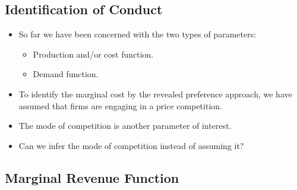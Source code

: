 \documentclass[
]{book}
\providecommand{\tightlist}{%
  \setlength{\itemsep}{0pt}\setlength{\parskip}{0pt}}
\begin{document}
\hypertarget{identification-of-conduct-1}{%
\subsection{Identification of Conduct}\label{identification-of-conduct-1}}

\begin{itemize}
\tightlist
\item
  So far we have been concerned with the two types of parameters:

  \begin{itemize}
  \tightlist
  \item
    Production and/or cost function.
  \item
    Demand function.
  \end{itemize}
\item
  To identify the marginal cost by the revealed preference approach, we have assumed that firms are engaging in a price competition.
\item
  The mode of competition is another parameter of interest.
\item
  Can we infer the mode of competition instead of assuming it?
\end{itemize}

\hypertarget{marginal-revenue-function}{%
\subsection{Marginal Revenue Function}\label{marginal-revenue-function}}
\end{document}

